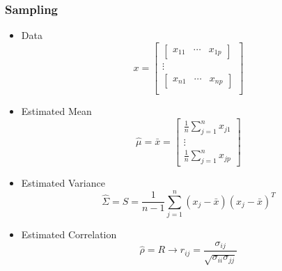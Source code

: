 \documentclass[aspectratio=169,10pt,t]{beamer}
\begin{document}
\begin{frame}[t]
    \frametitle{Sampling}
    \begin{itemize}
        \item Data
            \[
                x = 
                \begin{bmatrix}
                    \begin{bmatrix}
                        x_{11} & \cdots & x_{1p}
                    \end{bmatrix}\\
                    \vdots\\
                    \begin{bmatrix}
                        x_{n1} & \cdots & x_{np}
                    \end{bmatrix}\\
                \end{bmatrix}
            \] 
        \item Estimated Mean
            \[
                \hat{\mu} = \bar{x} = 
                \begin{bmatrix}
                    \frac{1}{n} \sum^{n}_{j=1} x_{j1}\\
                    \vdots\\
                    \frac{1}{n} \sum^{n}_{j=1} x_{jp}
                \end{bmatrix}
            \] 
        \item Estimated Variance
            \[
                \hat{\Sigma} = S = 
                \frac{1}{n-1} \sum^{n}_{j=1} 
                \left( x_j - \bar{x}  \right) 
                \left( x_j - \bar{x}  \right) ^{T}
            \] 
				\item Estimated Correlation
					\[
					\hat{\rho} = R
					\rightarrow
					r_{ij} = \frac{\sigma_{ij}}{\sqrt{\sigma_{ii} \sigma_{jj}}} 
					\] 
    \end{itemize}
\end{frame}
\end{document}
